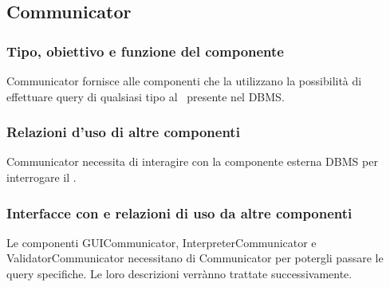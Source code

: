 \subsection{Communicator}
\subsubsection{Tipo, obiettivo e funzione del componente}
Communicator fornisce alle componenti che la utilizzano la possibilit\`a di effettuare query di qualsiasi tipo al \rp\ presente nel DBMS.
\subsubsection{Relazioni d'uso di altre componenti}
Communicator necessita di interagire con la componente esterna DBMS per interrogare il \rp.
\subsubsection{Interfacce con e relazioni di uso da altre componenti}
Le componenti GUICommunicator, InterpreterCommunicator e ValidatorCommunicator necessitano di Communicator per potergli passare le query specifiche. Le loro descrizioni verr\`anno trattate successivamente.

